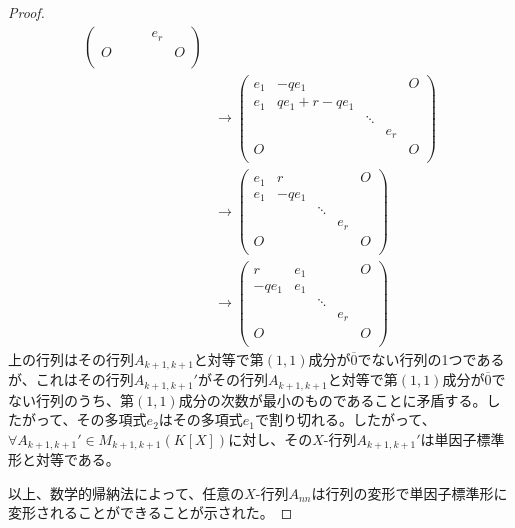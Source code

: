 \documentclass[dvipdfmx]{jsarticle}
\begin{document}
\begin{proof}
\begin{align*}
\begin{pmatrix}
\  & \  & \  & e_{r} & \  \\
O & \  & \  & \  & O \\
\end{pmatrix}\\
&\rightarrow \begin{pmatrix}
e_{1} & - qe_{1} & \  & \  & O \\
e_{1} & qe_{1} + r - qe_{1} & \  & \  & \  \\
\  & \  & \ddots & \  & \  \\
\  & \  & \  & e_{r} & \  \\
O & \  & \  & \  & O \\
\end{pmatrix}\\
&\rightarrow \begin{pmatrix}
e_{1} & r & \  & \  & O \\
e_{1} & - qe_{1} & \  & \  & \  \\
\  & \  & \ddots & \  & \  \\
\  & \  & \  & e_{r} & \  \\
O & \  & \  & \  & O \\
\end{pmatrix}\\
&\rightarrow \begin{pmatrix}
r & e_{1} & \  & \  & O \\
 - qe_{1} & e_{1} & \  & \  & \  \\
\  & \  & \ddots & \  & \  \\
\  & \  & \  & e_{r} & \  \\
O & \  & \  & \  & O \\
\end{pmatrix}
\end{align*}
上の行列はその行列$A_{k + 1,k + 1}$と対等で第$(1,1)$成分が$\overline{0}$でない行列の1つであるが、これはその行列$A_{k + 1,k + 1}'$がその行列$A_{k + 1,k + 1}$と対等で第$(1,1)$成分が$\overline{0}$でない行列のうち、第$(1,1)$成分の次数が最小のものであることに矛盾する。したがって、その多項式$e_{2}$はその多項式$e_{1}$で割り切れる。したがって、$\forall A_{k + 1,k + 1}' \in M_{k + 1,k + 1}\left( K[ X] \right)$に対し、その$X$-行列$A_{k + 1,k + 1}'$は単因子標準形と対等である。\par
以上、数学的帰納法によって、任意の$X$-行列$A_{nn}$は行列の変形で単因子標準形に変形されることができることが示された。
\end{proof}
\end{document}
